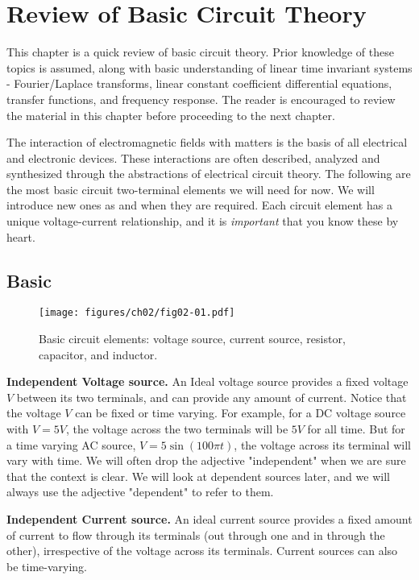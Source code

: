 \chapter{Review of Basic Circuit Theory}\label{chp:circuit_theory}

This chapter is a quick review of basic circuit theory. Prior knowledge of these topics is assumed, along with basic understanding of linear time invariant systems - Fourier/Laplace transforms, linear constant coefficient differential equations, transfer functions, and frequency response. The reader is encouraged to review the material in this chapter before proceeding to the next chapter.

The interaction of electromagnetic fields with matters is the basis of all electrical and electronic devices. These interactions are often described, analyzed and synthesized through the abstractions of electrical circuit theory. The following are the most basic circuit two-terminal elements we will need for now. We will introduce new ones as and when they are required. Each circuit element has a unique voltage-current relationship, and it is \emph{important} that you know these by heart.

\section{Basic}
\begin{figure}[b]
    \centering
    \texttt{[image: figures/ch02/fig02-01.pdf]}
    \caption{Basic circuit elements: voltage source, current source, resistor, capacitor, and inductor.}
    \label{fig:02-01}
\end{figure}

\noindent\textbf{Independent Voltage source.} An Ideal voltage source provides a fixed voltage $V$ between its two terminals, and can provide any amount of current. Notice that the voltage $V$ can be fixed or time varying. For example, for a DC voltage source with $V = 5V$, the voltage across the two terminals will be $5V$ for all time. But for a time varying AC source, $V = 5 \sin \left( 100\pi t \right)$, the voltage across its terminal will vary with time. We will often drop the adjective "independent" when we are sure that the context is clear. We will look at dependent sources later, and we will always use the adjective "dependent" to refer to them.

\noindent \textbf{Independent Current source.} An ideal current source provides a fixed amount of current to flow through its terminals (out through one and in through the other), irrespective of the voltage across its terminals. Current sources can also be time-varying.

